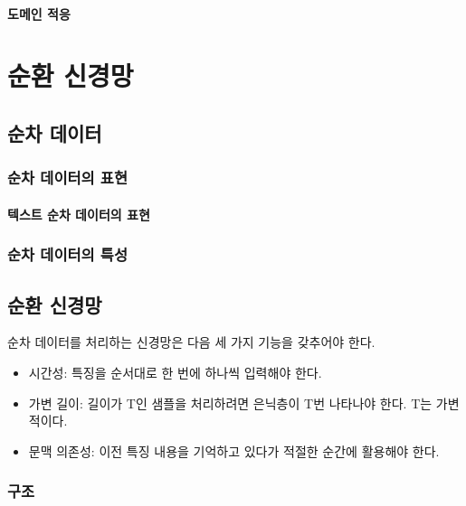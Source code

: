 \documentclass [12pt] {oblivoir}
\let\oldsubsubsection=\subsubsection
\renewcommand{\subsubsection}
{
  \filbreak
  \oldsubsubsection
}
\begin{document}
\paragraph*{도메인 적응}\mbox{}

\vspace{3mm}

\newpage
\section{순환 신경망}

\subsection{순차 데이터}

\subsubsection{순차 데이터의 표현}

\paragraph*{텍스트 순차 데이터의 표현}\mbox{}

\vspace{3mm}

\subsubsection{순차 데이터의 특성}

\subsection{순환 신경망}

순차 데이터를 처리하는 신경망은 다음 세 가지 기능을 갖추어야 한다.

\begin{itemize}
  \item 시간성: 특징을 순서대로 한 번에 하나씩 입력해야 한다.
  \item 가변 길이: 길이가 T인 샘플을 처리하려면 은닉층이 T번 나타나야 한다. T는 가변적이다.
  \item 문맥 의존성: 이전 특징 내용을 기억하고 있다가 적절한 순간에 활용해야 한다.
\end{itemize}

\subsubsection{구조}
\end{document}
